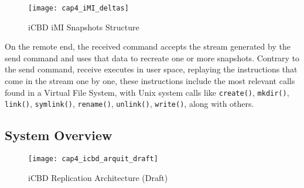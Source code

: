 \begin{figure}[htbp]
    \centering
    \texttt{[image: cap4\_iMI\_deltas]}
    \caption{iCBD iMI Snapshots Structure}
    \label{fig:imi_snap}
\end{figure}
\newpage

On the remote end, the received command accepts the stream generated by the send command and uses that data to recreate one or more snapshots. Contrary to the send command, receive executes in user space, replaying the instructions that come in the stream one by one, these instructions include the most relevant calls found in a Virtual File System, with Unix system calls like \texttt{create()}, \texttt{mkdir()}, \texttt{link()}, \texttt{symlink()}, \texttt{rename()}, \texttt{unlink()}, \texttt{write()}, along with others.~\cite{btrfs_design}







\subsection{System Overview}
\label{sub:system_overview}


\begin{figure}[htbp]
	\centering
	\texttt{[image: cap4\_icbd\_arquit\_draft]}
	\caption{iCBD Replication Architecture (Draft)}
	\label{fig:icbd_rep_architecture}
\end{figure}


